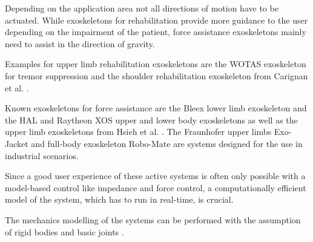 \documentclass[letterpaper, 10 pt, conference]{ieeeconf}  %
\begin{document}

Depending on the application area not all directions of motion have to be actuated.
While exoskeletons for rehabilitation provide more guidance to the user depending on the impairment of the patient, force assistance exoskeletons mainly need to assist in the direction of gravity.
%
%

Examples for upper limb rehabilitation exoskeletons are the WOTAS exoskeleton for tremor suppression \cite{RoconBelRuiMan2007} and the shoulder rehabilitation exoskeleton from Carignan et al. \cite{CarignanLis2005}.

Known exoskeletons for force assistance are the Bleex lower limb exoskeleton \cite{ChuKazZos2005} and the HAL \cite{Sankai2010} and Raytheon XOS upper and lower body exoskeletons as well as the upper limb exoskeletons from Hsieh et al. \cite{HsiehChiLan2015}. 
The Fraunhofer upper limbs Exo-Jacket \cite{Ebrahimi2017} and full-body exoskeleton Robo-Mate \cite{StadlerAltSchSch2017} are systems designed for the use in industrial scenarios.

Since a good user experience of these active systems is often only possible with a model-based control like impedance and force control, a computationally efficient model of the system, which has to run in real-time, is crucial.


The mechanics modelling of the systems can be performed with the assumption of rigid bodies and basic joints \cite{Pons2008}.
\end{document}
